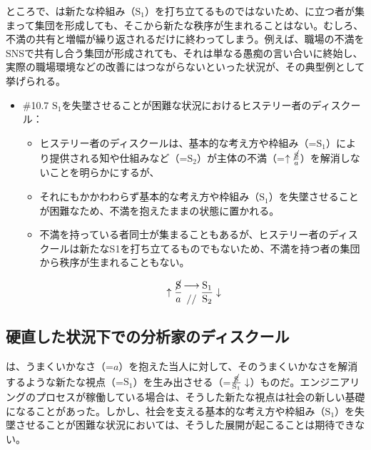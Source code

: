 ところで、は新たな枠組み（\(\textrm{S}_1\)）を打ち立てるものではないため、に立つ者が集まって集団を形成しても、そこから新たな秩序が生まれることはない。むしろ、不満の共有と増幅が繰り返されるだけに終わってしまう。例えば、職場の不満をSNSで共有し合う集団が形成されても、それは単なる愚痴の言い合いに終始し、実際の職場環境などの改善にはつながらないといった状況が、その典型例として挙げられる。

\begin{note}{}
  \begin{itemize}
    \tightlist
    \item{\#10.7} $\textrm{S}_1$を失墜させることが困難な状況におけるヒステリー者のディスクール：
      \begin{itemize}
        \tightlist
        \item ヒステリー者のディスクールは、基本的な考え方や枠組み（=$\textrm{S}_1$）により提供される知や仕組みなど（=$\textrm{S}_2$）が主体の不満（=$\uparrow\frac{\cancel{\textrm{S}}}{a}$）を解消しないことを明らかにするが、
        \item それにもかかわわらず基本的な考え方や枠組み（$\textrm{S}_1$）を失墜させることが困難なため、不満を抱えたままの状態に置かれる。
        \item 不満を持っている者同士が集まることもあるが、ヒステリー者のディスクールは新たなS1を打ち立てるものでもないため、不満を持つ者の集団から秩序が生まれることもない。
      \end{itemize}

$$
\uparrow\frac{\cancel{\textrm{S}}}{a}\genfrac{}{}{0pt}{}{\longrightarrow}{//}\frac{\mathrm{S_1}}{\mathrm{S_2}}\downarrow
$$
  \end{itemize}
\end{note}

\subsection{硬直した状況下での分析家のディスクール}\label{ux786cux76f4ux3057ux305fux72b6ux6cc1ux4e0bux3067ux306eux5206ux6790ux5bb6ux306eux30c7ux30a3ux30b9ux30afux30fcux30eb}

は、うまくいかなさ（=\(a\)）を抱えた当人に対して、そのうまくいかなさを解消するような新たな視点（=\(\textrm{S}_1\)）を生み出させる（=\(\frac{\cancel{\textrm{S}}}{\textrm{S}_1}\downarrow\)）ものだ。エンジニアリングのプロセスが稼働している場合は、そうした新たな視点は社会の新しい基礎になることがあった。しかし、社会を支える基本的な考え方や枠組み（\(\textrm{S}_1\)）を失墜させることが困難な状況においては、そうした展開が起こることは期待できない。

